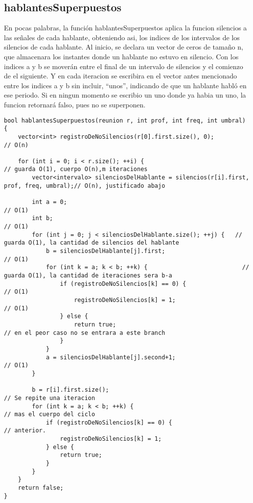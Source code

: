 \documentclass{article}
\begin{document}
\subsection{hablantesSuperpuestos}
En pocas palabras, la función hablantesSuperpuestos aplica la funcion silencios a las señales de cada hablante,
obteniendo asi, los indices de los intervalos de los silencios de cada hablante.
Al inicio, se declara un vector de ceros de tamaño n, que almacenara los instantes donde un hablante no estuvo en
silencio. \newline
Con los indices a y b se moverán entre el final de un intervalo de silencios y el comienzo de el siguiente. Y en cada
iteracion se escribira en el vector antes mencionado entre los indices a y b sin incluir, ``unos'', indicando de que un
hablante habló en ese periodo. \newline
Si en ningun momento se escribio un uno donde ya habia un uno, la funcion retornará falso, pues no se superponen. \newline

\begin{lstlisting}
bool hablantesSuperpuestos(reunion r, int prof, int freq, int umbral) {
    vector<int> registroDeNoSilencios(r[0].first.size(), 0);                               // O(n)

    for (int i = 0; i < r.size(); ++i) {                                       // guarda O(1), cuerpo O(n),m iteraciones
        vector<intervalo> silenciosDelHablante = silencios(r[i].first, prof, freq, umbral);// O(n), justificado abajo

        int a = 0;                                                                         // O(1)
        int b;                                                                             // O(1)
        for (int j = 0; j < silenciosDelHablante.size(); ++j) {   // guarda O(1), la cantidad de silencios del hablante
            b = silenciosDelHablante[j].first;                                             // O(1)
            for (int k = a; k < b; ++k) {                           // guarda O(1), la cantidad de iteraciones sera b-a
                if (registroDeNoSilencios[k] == 0) {                                       // O(1)
                    registroDeNoSilencios[k] = 1;                                          // O(1)
                } else {
                    return true;                                          // en el peor caso no se entrara a este branch
                }
            }
            a = silenciosDelHablante[j].second+1;                                          // O(1)
        }

        b = r[i].first.size();                                                             // Se repite una iteracion
        for (int k = a; k < b; ++k) {                                                      // mas el cuerpo del ciclo
            if (registroDeNoSilencios[k] == 0) {                                           // anterior.
                registroDeNoSilencios[k] = 1;
            } else {
                return true;
            }
        }
    }
    return false;
}
\end{lstlisting}
\end{document}
